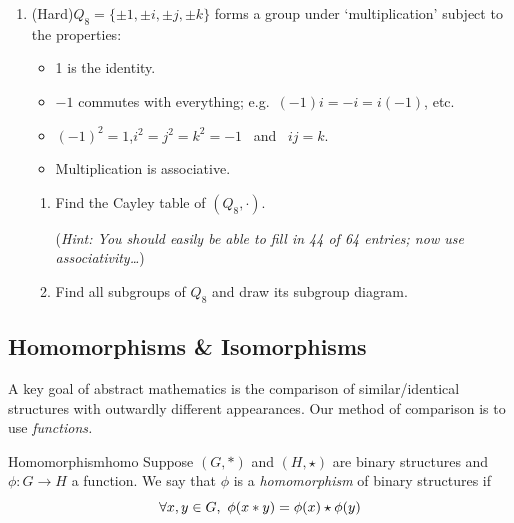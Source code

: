\begin{exercises}
\begin{enumerate}
\begin{enumerate}
	    \item (Hard)\lstsp $\rSL_n(\Z)=\bigl\{A\in \rM_n(\Z):\det A=1\bigr\}$: all entries in these matrices are \emph{integers.}\par
	    (\emph{Hint: look up the classical adjoint $\operatorname{adj}A$ of a square matrix})
	  \end{enumerate}
	  Now construct a diagram showing the subgroup relationships between the groups
	  \[
	  	\rGL_n(\R),\quad \rSL_n(\R),\quad \rO_n(\R),\quad \rSO_n(\R),\quad \mathcal Q_n,\quad \rSL_n(\Z)\tag{\emph{ignore $\rSp_{2n}(\R)$}}
	  \]
	  
	 	
	 	\item\label{exs:quaternion} (Hard)\lstsp $Q_8=\{\pm 1,\pm i,\pm j,\pm k\}$ forms a group under `multiplication' subject to the properties:
	  \begin{itemize}\itemsep0pt
	    \item 1 is the identity.
	    \item $-1$ commutes with everything; e.g.\ $(-1)i=-i=i(-1)$, etc.
	    \item $(-1)^2=1$,\quad $i^2=j^2=k^2=-1$ \ and \ $ij=k$.
	    \item Multiplication is associative.
	  \end{itemize}
	  \begin{enumerate}
	    \item Find the Cayley table of $(Q_8,\cdot)$.\par
	  	(\emph{Hint: You should easily be able to fill in 44 of 64 entries; now use associativity\ldots})
	  
	  	\item Find all subgroups of $Q_8$ and draw its subgroup diagram.
		\end{enumerate}
	 
	\end{enumerate}
\end{exercises}


\clearpage



\subsection{Homomorphisms \& Isomorphisms}\label{sec:morph}

A key goal of abstract mathematics is the comparison of similar/identical structures with outwardly different appearances. Our method of comparison is to use \emph{functions.}

\begin{defn}{Homomorphism}{homo}
	Suppose $(G,\ast)$ and $(H,\star)$ are binary structures and $\phi:G\to H$ a function. We say that $\phi$ is a \emph{homomorphism} of binary structures if
	\[
		\forall x,y\in G,\ \phi(x\mathbin{\ast} y)=\phi(x)\mathbin{\star}\phi(y)
	\]
\end{defn}

